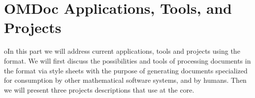 
\part{OMDoc Applications, Tools, and Projects}\label{part:applications}
oIn this part we will address current applications, tools and projects using the
{\omdoc} format.  We will first discuss the possibilities and tools of processing
documents in the {\omdoc} format via style sheets with the purpose of generating
documents specialized for consumption by other mathematical software systems, and
by humans. Then we will present three projects descriptions that use {\omdoc} at
the core.

